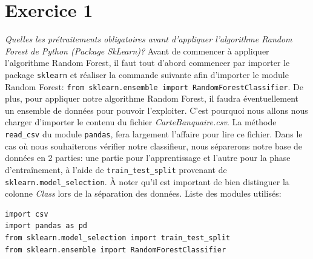 \documentclass[a4paper, 12pt, oneside]{book}
\begin{document}
\section{Exercice 1}
\textit{Quelles les prétraitements obligatoires avant d’appliquer l’algorithme Random Forest de Python (Package SkLearn)?}
\newline
Avant de commencer à appliquer l'algorithme Random Forest, il faut tout d'abord commencer par importer le package \texttt{sklearn} et réaliser la commande suivante afin d'importer le module Random Forest: \texttt{from sklearn.ensemble import RandomForestClassifier}.
De plus, pour appliquer notre algorithme Random Forest, il faudra éventuellement un ensemble de données pour pouvoir l'exploiter. C'est pourquoi nous allons nous charger d'importer le contenu du fichier \textit{CarteBanquaire.csv}. La méthode \texttt{read\_csv} du module \texttt{pandas}, fera largement l'affaire pour lire ce fichier.
\newline
Dans le cas où nous souhaiterons vérifier notre classifieur, nous séparerons notre base de données en 2 parties: une partie pour l'apprentissage et l'autre pour la phase d'entraînement, à l'aide de \texttt{train\_test\_split} provenant de \texttt{sklearn.model\_selection}. À noter qu'il est important de bien distinguer la colonne \textit{Class} lors de la séparation des données.
\newline \newline
Liste des modules utilisés:
\begin{verbatim}
import csv
import pandas as pd
from sklearn.model_selection import train_test_split
from sklearn.ensemble import RandomForestClassifier
\end{verbatim}
\end{document}
